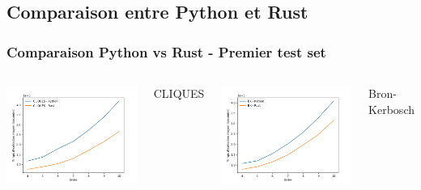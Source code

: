 \documentclass{beamer}
\begin{document}
\subsection{Comparaison entre Python et Rust}
\begin{frame}
\frametitle{Comparaison Python vs Rust - Premier test set}
\begin{columns}
  \centering
 \includegraphics[width=\textwidth]{images/total_new_pyrust_CLIQUES_plot.png}
  \caption{CLIQUES}%
  \centering
  \includegraphics[width=\textwidth]{images/total_new_pyrust_BK_plot.png}
  \caption{Bron-Kerbosch}%
  \centering

\end{columns}
\end{frame}
\end{document}
